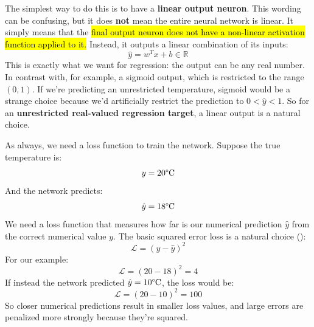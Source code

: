 \begin{itemize}
        The simplest way to do this is to have a \textbf{linear output neuron}. This wording can be confusing, but it does \textbf{not} mean the entire neural network is linear. It simply means that the \hl{final output neuron does not have a non-linear activation function applied to it.} Instead, it outputs a linear combination of its inputs:
        \begin{equation*}
            \hat{y} = w^{T} x + b \in \mathbb{R}
        \end{equation*}
        This is exactly what we want for regression: the output can be any real number. In contrast with, for example, a sigmoid output, which is restricted to the range $(0, 1)$. If we're predicting an unrestricted temperature, sigmoid would be a strange choice because we'd artificially restrict the prediction to $0 < \hat{y} < 1$. So for an \textbf{unrestricted real-valued regression target}, a linear output is a natural choice.

        As always, we need a loss function to train the network. Suppose the true temperature is:
        \begin{equation*}
            y = 20\degree \text{C}
        \end{equation*}
        And the network predicts:
        \begin{equation*}
            \hat{y} = 18\degree \text{C}
        \end{equation*}
        We need a loss function that measures how far is our numerical prediction $\hat{y}$ from the correct numerical value $y$. The basic squared error loss is a natural choice ():
        \begin{equation*}
            \mathcal{L} = \left(y - \hat{y}\right)^2
        \end{equation*}
        For our example:
        \begin{equation*}
            \mathcal{L} = \left(20 - 18\right)^2 = 4
        \end{equation*}
        If instead the network predicted $\hat{y} = 10\degree \text{C}$, the loss would be:
        \begin{equation*}
            \mathcal{L} = \left(20 - 10\right)^2 = 100
        \end{equation*}
        So closer numerical predictions result in smaller loss values, and large errors are penalized more strongly because they're squared.


\end{itemize}
